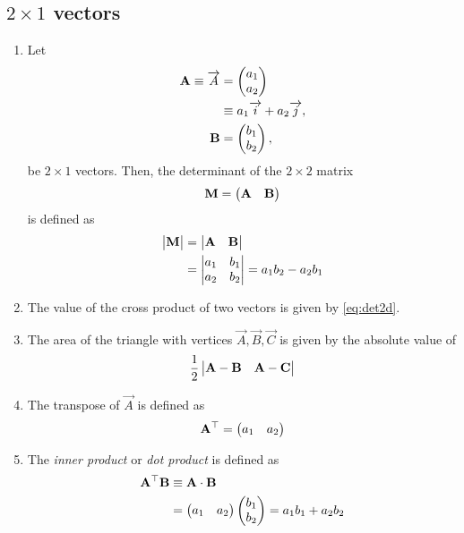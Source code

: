 \documentclass[journal,12pt,twocolumn]{IEEEtran}
\renewcommand\thesection{\arabic{section}}
\renewcommand\thesubsection{\thesection.\arabic{subsection}}
\begin{document}
\subsection{$2\times 1$ vectors}
\renewcommand{\theequation}{\theenumi}
\begin{enumerate}[label=\thesubsection.\arabic*.,ref=\thesubsection.\theenumi]
\item Let 
\begin{align}
  \mathbf{A} \equiv \overrightarrow{A} &= \begin{pmatrix}a_1\\a_2\end{pmatrix} 
  \\
  &\equiv a_1\overrightarrow{i}+a_2\overrightarrow{j}, 
  \\
  \mathbf{B} &= \begin{pmatrix}b_1\\b_2\end{pmatrix}, 
\end{align}
be $2 \times 1$ vectors.
Then, the determinant of the $2 \times 2$ matrix 
\begin{align}  
  \mathbf{M} = \begin{pmatrix}\mathbf{A} & \mathbf{B}\end{pmatrix}
\end{align}
is defined as
\begin{align}
  \label{eq:det2d}
  \begin{vmatrix}\mathbf{M}\end{vmatrix} &= \begin{vmatrix}\mathbf{A} & \mathbf{B}\end{vmatrix} 
  \\
  &= \begin{vmatrix}a_1 & b_1\\a_2 & b_2\end{vmatrix} = a_1b_2 - a_2 b_1
\end{align}
%
\item The value of the cross product of two vectors is given by  
  \eqref{eq:det2d}.
\item The area of the triangle with vertices $\vec{A}, \vec{B}, \vec{C}$ is given by the absolute value of 
\begin{align}
  \label{eq:area2d}
\frac{1}{2} \begin{vmatrix}\mathbf{A-B} & \mathbf{A-C}\end{vmatrix}
  \end{align}
  \item  The transpose of $\vec{A}$ is defined as
\begin{align}
  \label{eq:transpose2d}
  \mathbf{A}^{\top}  = \begin{pmatrix}a_1 & a_2\end{pmatrix}
\end{align}
%
\item The {\em inner product} or {\em dot product} is defined as
\begin{align}
  \label{eq:dot2d}
  \mathbf{A}^{\top} \mathbf{B} &\equiv \mathbf{A} \cdot \mathbf{B} 
  \\
  &= \begin{pmatrix}a_1 & a_2\end{pmatrix} \begin{pmatrix}b_1 \\ b_2\end{pmatrix}= a_1b_1+a_2b_2 
\end{align}

\end{enumerate}
\end{document}
